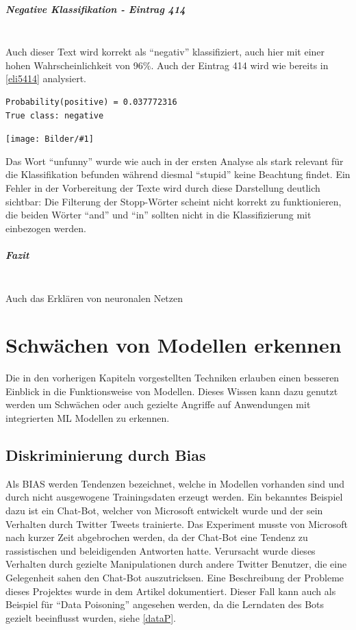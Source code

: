 \documentclass[
  12pt, %
  a4paper, %
  oneside, %
  openany, 
  numbers=noenddot, %
  BCOR=5mm, %
  parskip=half*, %
  thesis, %
]{bfhbook}
\newcommand{\parag}[1]{\paragraph*{#1}\mbox{}\\}
\newcommand{\imgText}[3]{
\begin{center}
    \begin{minipage}[t]{0.6\textwidth}
    		\vspace{0pt}
		\texttt{[image: Bilder/\#1]}
		\captionof{figure}{#2}
	\end{minipage}\hfill
    \begin{minipage}[t]{0.4\textwidth}
    		\vspace{5pt}
  		#3
    \end{minipage}
\end{center}
}
\begin{document}
\parag{Negative Klassifikation - Eintrag 414}
Auch dieser Text wird korrekt als ``negativ'' klassifiziert, auch hier mit einer hohen Wahrscheinlichkeit von 96\%.
Auch der Eintrag 414 wird wie bereits in \ref{eli5414} analysiert.
\begin{lstlisting}
Probability(positive) = 0.037772316
True class: negative
\end{lstlisting}
\imgText{MovieReview-LSTM-Display-414.PNG}{Visualisierung Movie Review 414}{
Das Wort ``unfunny'' wurde wie auch in der ersten Analyse als stark relevant für die Klassifikation befunden während diesmal ``stupid'' keine Beachtung findet. Ein Fehler in der Vorbereitung der Texte wird durch diese Darstellung deutlich sichtbar: Die Filterung der Stopp-Wörter scheint nicht korrekt zu funktionieren, die beiden Wörter ``and'' und ``in'' sollten nicht in die Klassifizierung mit einbezogen werden.
}

\parag{Fazit}
Auch das Erklären von neuronalen Netzen

\chapter{Schwächen von Modellen erkennen}
\label{vulnearabilities}

Die in den vorherigen Kapiteln vorgestellten Techniken erlauben einen besseren Einblick in die Funktionsweise von  Modellen. Dieses Wissen kann dazu genutzt werden um Schwächen oder auch gezielte Angriffe auf Anwendungen mit integrierten \Gls{ML} Modellen zu erkennen.

\section{Diskriminierung durch Bias}
Als \Gls{BIAS} werden Tendenzen bezeichnet, welche in Modellen vorhanden sind und durch nicht ausgewogene Trainingsdaten erzeugt werden.
Ein bekanntes Beispiel dazu ist ein Chat-Bot, welcher von Microsoft entwickelt wurde und der sein Verhalten durch Twitter Tweets trainierte. Das Experiment musste von Microsoft nach kurzer Zeit abgebrochen werden, da der Chat-Bot eine Tendenz zu rassistischen und beleidigenden Antworten hatte. Verursacht wurde dieses Verhalten durch gezielte Manipulationen durch andere Twitter Benutzer, die eine Gelegenheit sahen den Chat-Bot auszutricksen. Eine Beschreibung der Probleme dieses Projektes wurde in dem Artikel \parencite{msTay} dokumentiert.
Dieser Fall kann auch als Beispiel für ``Data Poisoning'' angesehen werden, da die Lerndaten des Bots gezielt beeinflusst wurden, siehe \ref{dataP}.
\end{document}
